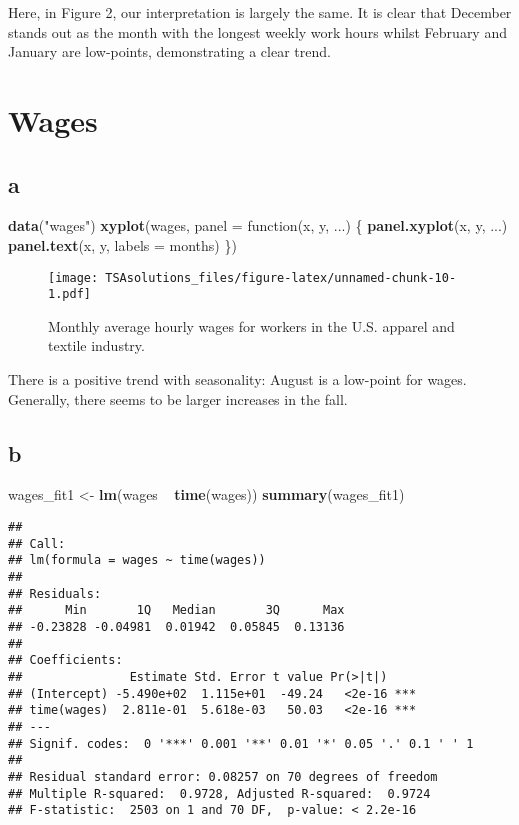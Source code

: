 \documentclass[]{book}
\newenvironment{Shaded}{\begin{snugshade}}{\end{snugshade}}
\newcommand{\KeywordTok}[1]{\textcolor[rgb]{0.13,0.29,0.53}{\textbf{{#1}}}}
\newcommand{\DataTypeTok}[1]{\textcolor[rgb]{0.13,0.29,0.53}{{#1}}}
\newcommand{\StringTok}[1]{\textcolor[rgb]{0.31,0.60,0.02}{{#1}}}
\newcommand{\NormalTok}[1]{{#1}}
\begin{document}
Here, in Figure 2, our interpretation is largely the same. It is clear
that December stands out as the month with the longest weekly work hours
whilst February and January are low-points, demonstrating a clear trend.

\section{Wages}\label{wages}

\subsection*{a}\label{a-22}

\begin{Shaded}
\begin{Highlighting}[]
\KeywordTok{data}\NormalTok{(}\StringTok{"wages"}\NormalTok{)}
\KeywordTok{xyplot}\NormalTok{(wages, }\DataTypeTok{panel =} \NormalTok{function(x, y, ...) \{}
  \KeywordTok{panel.xyplot}\NormalTok{(x, y, ...)}
  \KeywordTok{panel.text}\NormalTok{(x, y, }\DataTypeTok{labels =} \NormalTok{months)}
\NormalTok{\})}
\end{Highlighting}
\end{Shaded}

\begin{figure}[htbp]
\centering
\texttt{[image: TSAsolutions\_files/figure-latex/unnamed-chunk-10-1.pdf]}
\caption{\label{fig:unnamed-chunk-10}Monthly average hourly wages for
workers in the U.S. apparel and textile industry.}
\end{figure}

There is a positive trend with seasonality: August is a low-point for
wages. Generally, there seems to be larger increases in the fall.

\subsection*{b}\label{b-22}

\begin{Shaded}
\begin{Highlighting}[]
\NormalTok{wages_fit1 <-}\StringTok{ }\KeywordTok{lm}\NormalTok{(wages ~}\StringTok{ }\KeywordTok{time}\NormalTok{(wages))}
\KeywordTok{summary}\NormalTok{(wages_fit1)}
\end{Highlighting}
\end{Shaded}

\begin{verbatim}
## 
## Call:
## lm(formula = wages ~ time(wages))
## 
## Residuals:
##      Min       1Q   Median       3Q      Max 
## -0.23828 -0.04981  0.01942  0.05845  0.13136 
## 
## Coefficients:
##               Estimate Std. Error t value Pr(>|t|)    
## (Intercept) -5.490e+02  1.115e+01  -49.24   <2e-16 ***
## time(wages)  2.811e-01  5.618e-03   50.03   <2e-16 ***
## ---
## Signif. codes:  0 '***' 0.001 '**' 0.01 '*' 0.05 '.' 0.1 ' ' 1
## 
## Residual standard error: 0.08257 on 70 degrees of freedom
## Multiple R-squared:  0.9728, Adjusted R-squared:  0.9724 
## F-statistic:  2503 on 1 and 70 DF,  p-value: < 2.2e-16
\end{verbatim}
\end{document}
